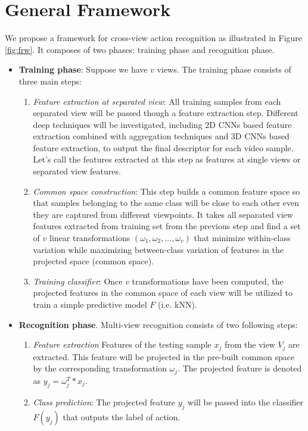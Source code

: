 
\section{General Framework} \label{sec:general_framework}
    We propose a framework for cross-view action recognition as illustrated in Figure \ref{fig:frw}. It composes of two phases: training phase and recognition phase. 
    \begin{itemize}
        \item \textbf{Training phase}: Suppose we have $v$ views. The training phase consists of three main steps: 
        \begin{enumerate}
            \item \textit{Feature extraction at separated view}: All training samples from each separated view will be passed though a feature extraction step. Different deep techniques will be investigated, including 2D CNNs based feature extraction combined with aggregation techniques and 3D CNNs based feature extraction, to output the final descriptor for each video sample. Let's call the features extracted at this step as features at single views or separated view features. 
            \item \textit{Common space construction}: This step builds a common feature space so that samples belonging to the same class will be close to each other even they are captured from different viewpoints. It takes all separated view features extracted from training set from the previous step and find a set of $v$ linear transformations $({\omega}_1, {\omega}_2, ..., {\omega}_v)$ that minimize within-class variation while maximizing between-class variation of features in the projected space (common space). 
            \item \textit{Training classifier}: Once $v$ transformations have been computed, the projected features in the common space of each view will be utilized to train a simple predictive model $F$ (i.e. kNN).
        \end{enumerate}
        \item \textbf{Recognition phase}. Multi-view recognition consists of two following steps:
        \begin{enumerate}
            \item \textit{Feature extraction} Features of the testing sample $x_j$ from the view $V_j$ are extracted. This feature will be projected in the pre-built common space by the corresponding transformation ${\omega}_j$. The projected feature is denoted as $y_j = {\omega}^T_j*x_j$.
            \item \textit{Class prediction}: The projected feature $y_j$ will be passed into the classifier $F(y_j)$ that outputs the label of action.
        \end{enumerate}
    \end{itemize}
